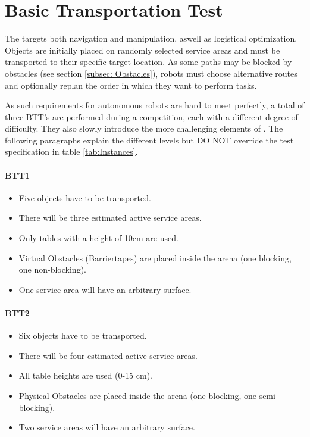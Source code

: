 \newpage
\section{Basic Transportation Test}
\label{sec:Basic Transportation Test}

The  targets both navigation and manipulation, aswell as logistical optimization. Objects are initially placed on randomly selected service areas and must be transported to their specific target location. As some paths may be blocked by obstacles (see section \ref{subsec: Obstacles}), robots must choose alternative routes and optionally replan the order in which they want to perform tasks.

As such requirements for autonomous robots are hard to meet perfectly,
a total of three BTT's are performed during a competition, each with a different degree of difficulty.
They also slowly introduce the more challenging elements of \RCAW .
The following paragraphs explain the different levels but DO NOT override the test specification in table \ref{tab:Instances}.

\paragraph{BTT1}
\begin{itemize}
\item Five objects have to be transported.
\item There will be three estimated active service areas.
\item Only tables with a height of 10cm are used. 
\item Virtual Obstacles (Barriertapes) are placed inside the arena (one blocking, one non-blocking).
\item One service area will have an arbitrary surface.
\end{itemize}

\paragraph{BTT2}
\begin{itemize}
\item Six objects have to be transported.
\item There will be four estimated active service areas.
\item All table heights are used (0-15 $\si{\centi\meter}$).
\item Physical Obstacles are placed inside the arena (one blocking, one semi-blocking).
\item Two service areas will have an arbitrary surface.
\end{itemize}

